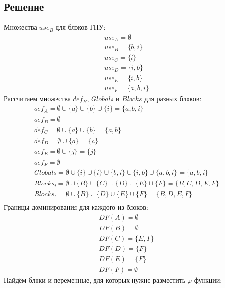 \documentclass[11pt]{article}
\begin{document}
\subsection{Решение}
\label{sec:org87352e3}
Множества \(use_B\) для блоков ГПУ:
\begin{gather*}
use_A = \emptyset \\
use_B = \{ b, i \} \\
use_C = \{ i \}\\
use_D = \{ i, b \}\\
use_E = \{ i, b \}\\
use_F = \{ a, b, i \}
\end{gather*}
Рассчитаем множества \(def_B\), \(Globals\) и \(Blocks\) для разных блоков:
\begin{gather*}
def_A = \emptyset \cup \{ a \} \cup \{ b \} \cup \{ i \} = \{ a, b, i \} \\
def_B = \emptyset \\
def_C = \emptyset \cup \{ a \} \cup \{ b \} = \{ a, b \} \\
def_D = \emptyset \cup \{ a \} = \{ a \} \\
def_E = \emptyset \cup \{ j \} = \{ j \} \\
def_F = \emptyset \\
Globals = \emptyset \cup \{ i \} \cup \{ i \} \cup \{ b, i \} \cup \{ i, b \} \cup \{ a, b, i \} = \{ a, b, i \} \\
Blocks_i = \emptyset \cup \{ B \} \cup \{ C \} \cup \{ D \} \cup \{ E \} \cup \{ F \} = \{ B, C, D, E, F \} \\
Blocks_b = \emptyset \cup \{ B \} \cup \{ D \} \cup \{ E \} \cup \{ F \} = \{ B, D, E, F \} \\
\end{gather*}
Границы доминирования для каждого из блоков:
\begin{gather*}
DF(A) = \emptyset \\
DF(B) = \emptyset \\
DF(C) = \{ E, F \} \\
DF(D) = \{ F \} \\
DF(E) = \{ F \} \\
DF(F) = \emptyset
\end{gather*}
Найдём блоки и переменные, для которых нужно разместить \(\varphi\)-функции:
\end{document}

